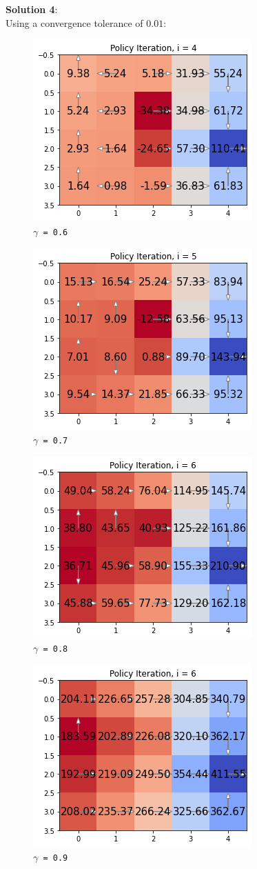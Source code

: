 \documentclass[submit]{harvardml}
\begin{document}
\textbf{Solution 4}:\\
Using a convergence tolerance of $0.01$:
\begin{figure}[h]
    \centering
    \includegraphics[width=0.5\linewidth]{HW6/plots/2.4.g=0.6.png}
    \caption{\texttt{$\gamma$ = 0.6}}
\end{figure}
\begin{figure}[h]
    \centering
    \includegraphics[width=0.5\linewidth]{HW6/plots/2.4.g=0.7.png}
    \caption{\texttt{$\gamma$ = 0.7}}
\end{figure}
\newpage
\begin{figure}[h]
    \centering
    \includegraphics[width=0.5\linewidth]{HW6/plots/2.4.g=0.8.png}
    \caption{\texttt{$\gamma$ = 0.8}}
\end{figure}
\begin{figure}[h]
    \centering
    \includegraphics[width=0.5\linewidth]{HW6/plots/2.4.g=0.9.png}
    \caption{\texttt{$\gamma$ = 0.9}}
\end{figure}
\end{document}
